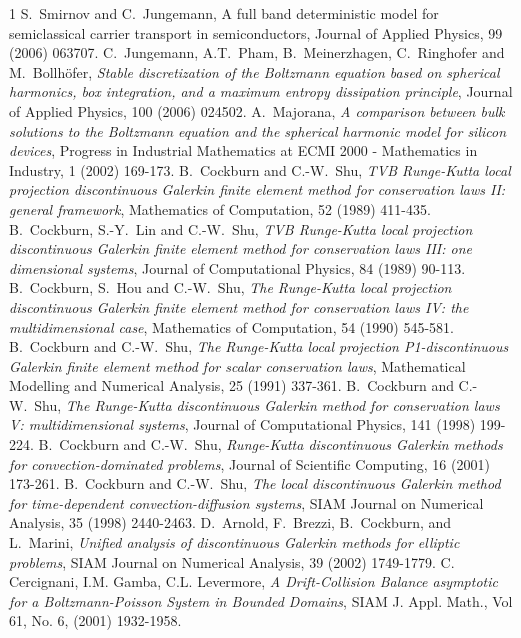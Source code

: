 \documentclass[11pt]{article}
\begin{document}
\begin{thebibliography}{1}
S.~Smirnov and C.~Jungemann,
{A full band deterministic model for semiclassical carrier transport in semiconductors},
Journal of Applied Physics, 99 (2006) 063707.
%
C.~Jungemann, A.T.~Pham, B.~Meinerzhagen, C.~Ringhofer and M.~Bollh{\"o}fer,
\emph{Stable discretization of the Boltzmann equation based on spherical harmonics, box integration, 
and a maximum entropy dissipation principle},
Journal of Applied Physics, 100 (2006) 024502.
%
A.~Majorana, 
\emph{A comparison between bulk solutions to the {Boltzmann} equation and the spherical harmonic 
model for silicon devices},
Progress in Industrial Mathematics at ECMI 2000 - Mathematics in Industry, 1 (2002) 169-173.
%
B.~Cockburn and C.-W.~Shu, 
\emph{TVB Runge-Kutta local projection discontinuous Galerkin finite element method for 
conservation laws II: general framework}, 
Mathematics of Computation, 52 (1989) 411-435.
%
B.~Cockburn, S.-Y.~Lin and C.-W.~Shu, 
\emph{TVB Runge-Kutta local projection discontinuous Galerkin finite element method for
conservation laws III: one dimensional systems}, 
Journal of Computational Physics, 84 (1989) 90-113.
%
B.~Cockburn, S.~Hou and C.-W.~Shu, 
\emph{The Runge-Kutta local projection discontinuous Galerkin finite element method for
conservation laws IV: the multidimensional case}, 
Mathematics of Computation, 54 (1990) 545-581.
%
B.~Cockburn and C.-W.~Shu, 
\emph{The Runge-Kutta local projection P1-discontinuous Galerkin finite element method for scalar
conservation laws}, 
Mathematical Modelling and Numerical Analysis, 25 (1991) 337-361.
%
B.~Cockburn and C.-W.~Shu, 
\emph{The Runge-Kutta discontinuous Galerkin method for conservation laws V: multidimensional 
systems},
Journal of Computational Physics, 141 (1998) 199-224.
%
B.~Cockburn and C.-W.~Shu, 
\emph{Runge-Kutta discontinuous Galerkin methods for con\-vection-dominated problems}, 
Journal of Scientific Computing, 16 (2001) 173-261.
%
B.~Cockburn and C.-W.~Shu, 
\emph{The local discontinuous Galerkin method for time-dependent convection-diffusion systems}, 
SIAM Journal on Numerical Analysis, 35 (1998) 2440-2463.
%
D.~Arnold, F.~Brezzi, B.~Cockburn, and L.~Marini, 
\emph{Unified analysis of discontinuous Galerkin methods for elliptic problems},
SIAM Journal on Numerical Analysis, 39 (2002) 1749-1779.
%
C. Cercignani, I.M. Gamba, C.L. Levermore, 
\emph{ A Drift-Collision Balance asymptotic for a Boltzmann-Poisson System in Bounded Domains}, SIAM J. Appl. Math., Vol 61, No. 6, (2001) 1932-1958.


\end{thebibliography}
\end{document}
